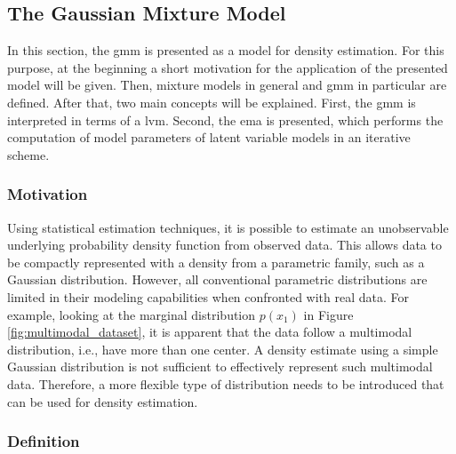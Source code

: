 \documentclass[../../../main.tex]{subfiles}
\begin{document}
\subsection{The Gaussian Mixture Model}

In this section, the \acrshort{gmm} is presented as a model for density estimation. For this purpose, at the beginning a short motivation for the application of the presented model will be given. Then, mixture models in general and \acrshort{gmm} in particular are defined. After that, two main concepts will be explained. First, the \acrshort{gmm} is interpreted in terms of a \acrshort{lvm}. Second, the \acrshort{ema} is presented, which performs the computation of model parameters of latent variable models in an iterative scheme.

\subsubsection{Motivation}
Using statistical estimation techniques, it is possible to estimate an unobservable underlying probability density function from observed data. This allows data to be compactly represented with a density from a parametric family, such as a Gaussian distribution. However, all conventional parametric distributions are limited in their modeling capabilities when confronted with real data. For example, looking at the marginal distribution $p(x_1)$ in Figure \ref{fig:multimodal_dataset}, it is apparent that the data follow a multimodal distribution, i.e., have more than one center. A density estimate using a simple Gaussian distribution is not sufficient to effectively represent such multimodal data. Therefore, a more flexible type of distribution needs to be introduced that can be used for density estimation.


\subsubsection{Definition}
\end{document}
